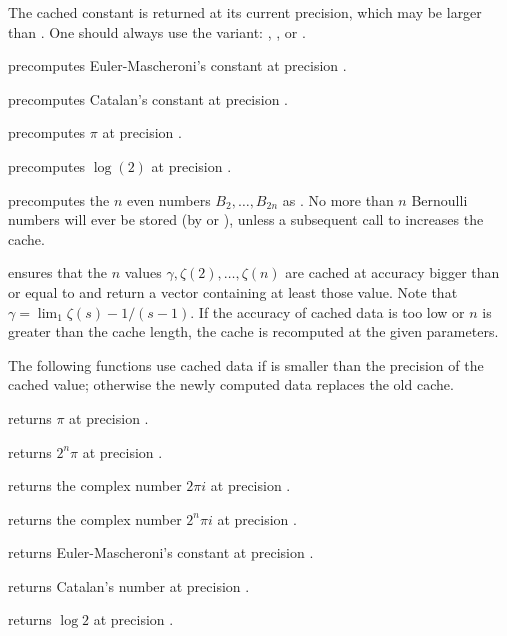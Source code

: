 
The cached constant is returned at its current precision, which may be larger
than . One should always use the  variant:
, , or .

 precomputes Euler-Mascheroni's constant
at precision .

 precomputes Catalan's constant at precision
.

 precomputes $\pi$ at precision .

 precomputes $\log(2)$ at precision
.

 precomputes the $n$ even  numbers
$B_2,\dots,B_{2n}$ as . No more than $n$ Bernoulli numbers will
ever be stored (by  or ), unless a subsequent
call to  increases the cache.

 ensures that the $n$ values
$\gamma, \zeta(2),\dots, \zeta(n)$ are cached at accuracy bigger than or equal
to  and return a vector containing at least those value. Note that
$\gamma = \lim_1 \zeta(s) - 1/(s-1)$. If the accuracy of cached data is too
low or $n$ is greater than the cache length, the cache is recomputed at the
given parameters.

The following functions use cached data if  is smaller than the
precision of the cached value; otherwise the newly computed data replaces the
old cache.

 returns $\pi$ at precision .

 returns $2^n\pi$ at precision .

 returns the complex number $2\pi i$ at
precision .

 returns the complex number $2^n\pi i$ at
precision .

 returns Euler-Mascheroni's constant at
precision .

 returns Catalan's number at precision .

 returns $\log 2$ at precision .

